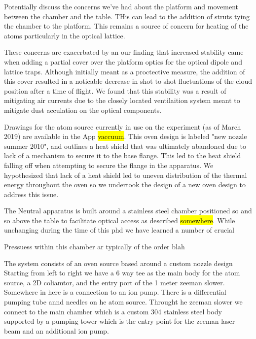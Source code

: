 Potentially discuss the concerns we've had about the platform and movement between the chamber and the table. THis can lead to the addition of struts tying the chamber to the platform. This remains a source of concern for heating of the atoms particularly in the optical lattice. 

These concerns are exacerbated by an our finding that increased stability came when adding a partial cover over the platform optics for the optical dipole and lattice traps. Although initially meant as a proctective measure, the addition of this cover resulted in a noticable decrease in shot to shot fluctuations of the cloud position after a time of flight. We found that this stability was a result of mitigating air currents due to the closely located ventilaition system meant to mitigate dust acculation on the optical components.

Drawings for the atom source currently in use on the experiment (as of March 2019) are available in the App \hl{vaccuum}. This oven design is labeled "new nozzle summer 2010", and outlines a heat shield that was ultimately abandoned due to lack of a mechanism to secure it to the base flange. This led to the heat shield falling off when attempting to secure the flange in the apparatus. We hypothesized that lack of a heat shield led to uneven distribution of the thermal energy throughout the oven so we undertook the design of a new oven design to address this issue.

The Neutral apparatus is built around a stainless steel chamber positioned so and so above the table to facilitate optical access as described \hl{somewhere}. While unchanging during the time of this phd we have learned a number of crucial 

Pressuess within this chamber ar typically of the order blah

The system consists of an oven source based around a custom nozzle design
Starting from left to right we have a 6 way tee as the main body for the atom source, a 2D coliamtor, and the entry port of the 1 meter zeeman slower. Somewhere in here is a connection to an ion pump.
There is a differential pumping tube annd needles on he atom source. Throught he zeeman slower we connect to the main chamber which is a custom 304 stainless steel body supported by a pumping tower which is the entry point for the zeeman laser beam and an additional ion pump. 

